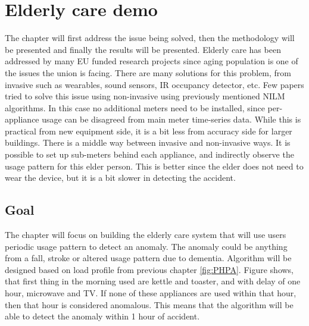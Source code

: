 
\chapter{Elderly care demo} %

\label{Chapter7} %

The chapter will first address the issue being solved, then the methodology will be presented and finally the results will be presented.
Elderly care has been addressed by many EU funded research projects since aging population is one of the issues the union is facing. 
There are many solutions for this problem, from invasive such as wearables, sound sensors, IR occupancy detector, etc. 
Few papers tried to solve this issue using non-invasive using previously mentioned NILM algorithms. 
In this case no additional meters need to be installed, since per-appliance usage can be disagreed from main meter time-series data. 
While this is practical from new equipment side, it is a bit less from accuracy side for larger buildings. 
There is a middle way between invasive and non-invasive ways. 
It is possible to set up sub-meters behind each appliance, and indirectly observe the usage pattern for this elder person. 
This is better since the elder does not need to wear the device, but it is a bit slower in detecting the accident. 

\section{Goal}

The chapter will focus on building the elderly care system that will use users periodic usage pattern to detect an anomaly.
The anomaly could be anything from a fall, stroke or altered usage pattern due to dementia. 
Algorithm will be designed based on load profile from previous chapter \ref{fig:PHPA}.
Figure shows, that first thing in the morning used are kettle and toaster, and with delay of one hour, microwave and TV. 
If none of these appliances are used within that hour, then that hour is considered anomalous.
This means that the algorithm will be able to detect the anomaly within 1 hour of accident.

